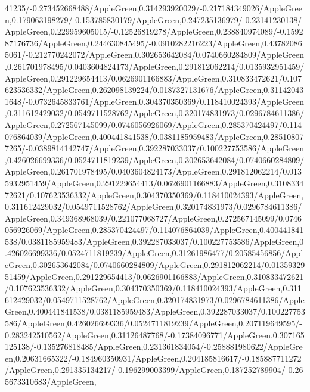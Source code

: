 {\begin{tikzternal}
{41235/-0.273452668488/AppleGreen,0.314293920029/-0.217184349026/AppleGreen,0.179063198279/-0.153785830179/AppleGreen,0.247235136979/-0.23141230138/AppleGreen,0.229959605015/-0.12526819278/AppleGreen,0.238840974089/-0.159287176736/AppleGreen,0.244630845495/-0.0910282216223/AppleGreen,0.437820865061/-0.212770242072/AppleGreen,0.302653642084/0.0740660284809/AppleGreen,0.261701978495/0.0403604824173/AppleGreen,0.291812062214/0.0135932951459/AppleGreen,0.291229654413/0.0626901166883/AppleGreen,0.310833472621/0.107623536332/AppleGreen,0.262098139224/0.0187327131676/AppleGreen,0.311420431648/-0.0732645833761/AppleGreen,0.304370350369/0.118410024393/AppleGreen,0.311612429032/0.0549711528762/AppleGreen,0.320174831973/0.0296784611386/AppleGreen,0.272567145099/0.0746056926069/AppleGreen,0.285370424497/0.114076864039/AppleGreen,0.400441841538/0.0381185959483/AppleGreen,0.285108077265/-0.0389814142747/AppleGreen,0.392287033037/0.100227753586/AppleGreen,0.426026699336/0.0524711819239/AppleGreen,0.302653642084/0.0740660284809/AppleGreen,0.261701978495/0.0403604824173/AppleGreen,0.291812062214/0.0135932951459/AppleGreen,0.291229654413/0.0626901166883/AppleGreen,0.310833472621/0.107623536332/AppleGreen,0.304370350369/0.118410024393/AppleGreen,0.311612429032/0.0549711528762/AppleGreen,0.320174831973/0.0296784611386/AppleGreen,0.349368968039/0.221077068727/AppleGreen,0.272567145099/0.0746056926069/AppleGreen,0.285370424497/0.114076864039/AppleGreen,0.400441841538/0.0381185959483/AppleGreen,0.392287033037/0.100227753586/AppleGreen,0.426026699336/0.0524711819239/AppleGreen,0.31261986477/0.20585456856/AppleGreen,0.302653642084/0.0740660284809/AppleGreen,0.291812062214/0.0135932951459/AppleGreen,0.291229654413/0.0626901166883/AppleGreen,0.310833472621/0.107623536332/AppleGreen,0.304370350369/0.118410024393/AppleGreen,0.311612429032/0.0549711528762/AppleGreen,0.320174831973/0.0296784611386/AppleGreen,0.400441841538/0.0381185959483/AppleGreen,0.392287033037/0.100227753586/AppleGreen,0.426026699336/0.0524711819239/AppleGreen,0.207119649595/-0.283242510562/AppleGreen,0.31126487768/-0.17384096771/AppleGreen,0.307165125138/-0.135276818485/AppleGreen,0.231361834054/-0.258881980622/AppleGreen,0.20631665322/-0.184960350931/AppleGreen,0.204185816617/-0.185887711272/AppleGreen,0.291335134217/-0.196299003399/AppleGreen,0.187252789904/-0.265673310683/AppleGreen,
}
\end{tikzternal}}
